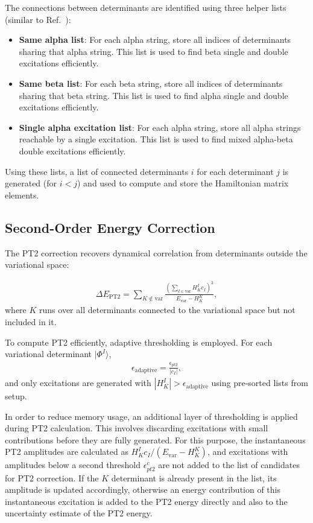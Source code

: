 \documentclass[a4paper,12pt,oneside]{book}
\newcommand{\beq}{\begin{equation}\begin{aligned}}
\newcommand{\eeq}{\end{aligned}\end{equation}}
\begin{document}
The connections between determinants are identified using three helper lists 
(similar to Ref.~\cite{sharma_semistochastic_2017}):
\begin{itemize}
\item \textbf{Same alpha list}: For each alpha string, store all indices of determinants sharing that alpha string.
This list is used to find beta single and double excitations efficiently.
\item \textbf{Same beta list}: For each beta string, store all indices of determinants sharing that beta string.
This list is used to find alpha single and double excitations efficiently.
\item \textbf{Single alpha excitation list}: For each alpha string, store all alpha strings reachable by a single excitation.
This list is used to find mixed alpha-beta double excitations efficiently.
\end{itemize}
Using these lists, a list of connected determinants $i$ for each determinant $j$ is generated
(for $i \lt j$) and used to compute and store the Hamiltonian matrix elements.



\subsection{Second-Order Energy Correction}
\label{sec:pt2}

The PT2 correction recovers dynamical correlation from determinants outside the variational 
space\cite{holmes16_hci}:

\beq
\Delta E_{\text{PT2}} = \sum_{K \notin \text{var}} 
    \frac{\left(\sum_{I \in \text{var}} H^I_{K} c_I\right)^2}{E_{\text{var}} - H^K_{K}},
\eeq
where $K$ runs over all determinants connected to the variational space but not included in it.

To compute PT2 efficiently, adaptive thresholding is employed. For each variational determinant $|\Phi^I\rangle$,
\beq
\epsilon_{\text{adaptive}} = \frac{\epsilon_{pt2}}{|c_I|},
\eeq
and only excitations are generated with $|H_{K}^{I}| \gt \epsilon_{\text{adaptive}}$ using pre-sorted lists from setup.

In order to reduce memory usage, an additional layer of thresholding is applied during PT2 calculation.
This involves discarding excitations with small contributions before they are fully generated.
For this purpose, the instantaneous PT2 amplitudes are calculated as $H_{K}^{I} c_I / (E_{\text{var}} - H_{K}^{K})$,
and excitations with amplitudes below a second threshold $\epsilon_{pt2}^c$ are not added to the 
list of candidates for PT2 correction. If the $K$ determinant is already present in the list, 
its amplitude is updated accordingly, otherwise an energy contribution of this instantaneous
excitation is added to the PT2 energy directly and also to the uncertainty estimate of the PT2 energy.
\end{document}

